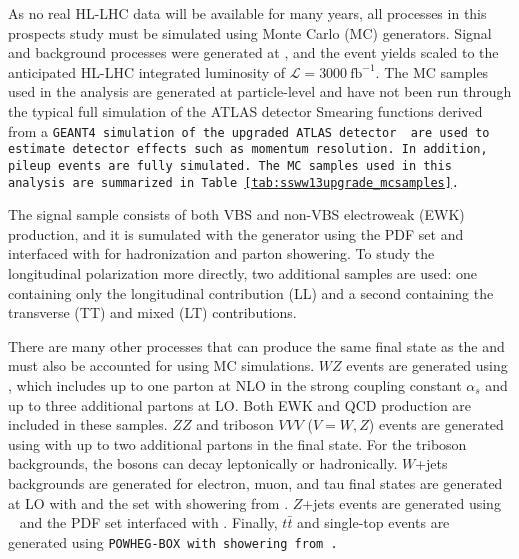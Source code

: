 As no real HL-LHC data will be available for many years, all processes in this prospects study must be simulated using Monte Carlo (MC) generators. 
Signal and background processes were generated at , and the event yields scaled to the anticipated HL-LHC integrated luminosity of $\mathcal{L}=3000~\textrm{fb}^{-1}$.
The MC samples used in the analysis are generated at particle-level and have not been run through the typical full simulation of the ATLAS detector
Smearing functions derived from a \tt{GEANT4} simulation of the upgraded ATLAS detector \cite{2003.GEANT4} are used to estimate detector effects such as momentum resolution.
In addition, pileup events are fully simulated.
The MC samples used in this analysis are summarized in Table~\ref{tab:ssww13upgrade_mcsamples}.

The signal sample consists of both VBS and non-VBS electroweak (EWK) \ssww production, and it is sumulated with the \mcatnlo generator \cite{2014.madgraph_mcnlo} using the \nnpdf PDF set \cite{2015.NNPDF3} and interfaced with  \cite{2015.pythia82} for hadronization and parton showering.
To study the longitudinal polarization more directly, two additional \mcatnlo \ssww samples are used: one containing only the longitudinal contribution (LL) and a second containing the transverse (TT) and mixed (LT) contributions.

There are many other processes that can produce the same final state as the \ssww and must also be accounted for using MC simulations.
$WZ$ events are generated using  \cite{2009.Sherpa, 2008.CS_Shower, 2009.METS}, which includes up to one parton at NLO in the strong coupling constant $\alpha_s$ and up to three additional partons at LO.  
Both EWK and QCD production are included in these samples.
$ZZ$ and triboson $VVV$ ($V = W,Z$) events are generated using  with up to two additional partons in the final state.
For the triboson backgrounds, the bosons can decay leptonically or hadronically.
$W$+jets backgrounds are generated for electron, muon, and tau final states are generated at LO with \mcatnlo and the \nnpdf set with showering from .
$Z$+jets events are generated using ~\cite{2010.powhegbox} and the \ctten PDF set \cite{2010.ct10} interfaced with .
Finally, $t\bar{t}$ and single-top events are generated using \tt{POWHEG-BOX} with showering from .



